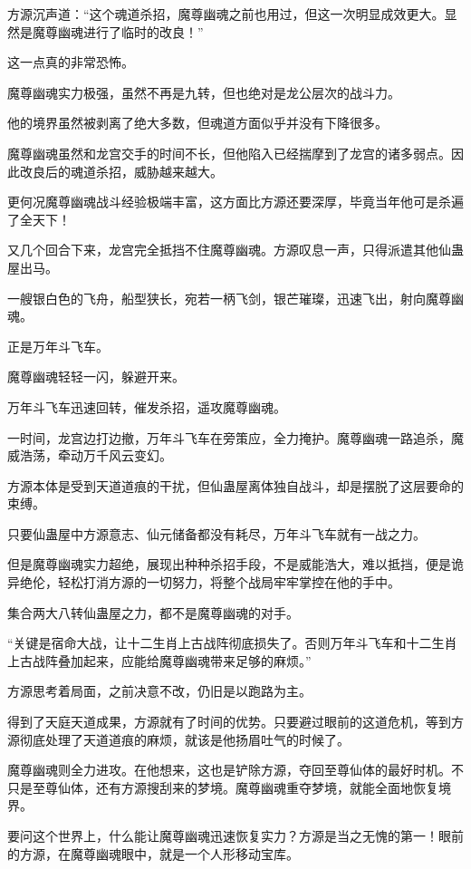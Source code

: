 \begin{this_body}
方源沉声道：“这个魂道杀招，魔尊幽魂之前也用过，但这一次明显成效更大。显然是魔尊幽魂进行了临时的改良！”

这一点真的非常恐怖。

魔尊幽魂实力极强，虽然不再是九转，但也绝对是龙公层次的战斗力。

他的境界虽然被剥离了绝大多数，但魂道方面似乎并没有下降很多。

魔尊幽魂虽然和龙宫交手的时间不长，但他陷入已经揣摩到了龙宫的诸多弱点。因此改良后的魂道杀招，威胁越来越大。

更何况魔尊幽魂战斗经验极端丰富，这方面比方源还要深厚，毕竟当年他可是杀遍了全天下！

又几个回合下来，龙宫完全抵挡不住魔尊幽魂。方源叹息一声，只得派遣其他仙蛊屋出马。

一艘银白色的飞舟，船型狭长，宛若一柄飞剑，银芒璀璨，迅速飞出，射向魔尊幽魂。

正是万年斗飞车。

魔尊幽魂轻轻一闪，躲避开来。

万年斗飞车迅速回转，催发杀招，遥攻魔尊幽魂。

一时间，龙宫边打边撤，万年斗飞车在旁策应，全力掩护。魔尊幽魂一路追杀，魔威浩荡，牵动万千风云变幻。

方源本体是受到天道道痕的干扰，但仙蛊屋离体独自战斗，却是摆脱了这层要命的束缚。

只要仙蛊屋中方源意志、仙元储备都没有耗尽，万年斗飞车就有一战之力。

但是魔尊幽魂实力超绝，展现出种种杀招手段，不是威能浩大，难以抵挡，便是诡异绝伦，轻松打消方源的一切努力，将整个战局牢牢掌控在他的手中。

集合两大八转仙蛊屋之力，都不是魔尊幽魂的对手。

“关键是宿命大战，让十二生肖上古战阵彻底损失了。否则万年斗飞车和十二生肖上古战阵叠加起来，应能给魔尊幽魂带来足够的麻烦。”

方源思考着局面，之前决意不改，仍旧是以跑路为主。

得到了天庭天道成果，方源就有了时间的优势。只要避过眼前的这道危机，等到方源彻底处理了天道道痕的麻烦，就该是他扬眉吐气的时候了。

魔尊幽魂则全力进攻。在他想来，这也是铲除方源，夺回至尊仙体的最好时机。不只是至尊仙体，还有方源搜刮来的梦境。魔尊幽魂重夺梦境，就能全面地恢复境界。

要问这个世界上，什么能让魔尊幽魂迅速恢复实力？方源是当之无愧的第一！眼前的方源，在魔尊幽魂眼中，就是一个人形移动宝库。


\end{this_body}
